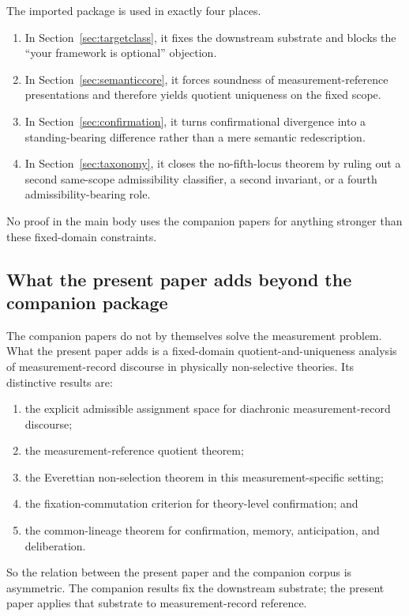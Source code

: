 The imported package is used in exactly four places.
\begin{enumerate}
    \item In Section~\ref{sec:targetclass}, it fixes the downstream substrate and blocks the
    \enquote{your framework is optional} objection.
    \item In Section~\ref{sec:semanticcore}, it forces soundness of measurement-reference
    presentations and therefore yields quotient uniqueness on the fixed scope.
    \item In Section~\ref{sec:confirmation}, it turns confirmational divergence into a standing-bearing
    difference rather than a mere semantic redescription.
    \item In Section~\ref{sec:taxonomy}, it closes the no-fifth-locus theorem by ruling out a second
    same-scope admissibility classifier, a second invariant, or a fourth admissibility-bearing role.
\end{enumerate}
No proof in the main body uses the companion papers for anything stronger than these fixed-domain
constraints.

\subsection{What the present paper adds beyond the companion package}

The companion papers do not by themselves solve the measurement problem. What the present paper
adds is a fixed-domain quotient-and-uniqueness analysis of measurement-record discourse in
physically non-selective theories. Its distinctive results are:
\begin{enumerate}
    \item the explicit admissible assignment space for diachronic measurement-record discourse;
    \item the measurement-reference quotient theorem;
    \item the Everettian non-selection theorem in this measurement-specific setting;
    \item the fixation-commutation criterion for theory-level confirmation; and
    \item the common-lineage theorem for confirmation, memory, anticipation, and deliberation.
\end{enumerate}
So the relation between the present paper and the companion corpus is asymmetric. The companion
results fix the downstream substrate; the present paper applies that substrate to measurement-record
reference.
